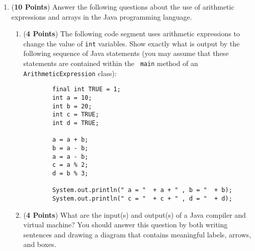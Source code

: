 \documentclass[12pt]{article}
\begin{document}
\begin{enumerate}
\begin{enumerate}
\begin{enumerate}
\item {\tt BankAccount account3 = new BankAccount();} \\
  {\tt account3.deposit(1200);} \\
  {\tt account3.deposit(account3.getBalance());}

\end{enumerate} 

\item \label{values_refs} ({\bf 4 Points}) The Java programming
  language includes primitive data types like {\tt double} and objects
  like {\tt Double}.  Furthermore, it also allows for the creation of
  new classes like {\tt BankAccount} and {\tt CheckingAccount}.  Show
  what the output will be when the {\tt main} method inside of the
  {\tt ValuesAndReferences} class is executed.  Clearly state why the
  output will look the way that you suggest.

\end{enumerate}

\newpage

\item ({\bf 10 Points}) Answer the following questions about the use
  of arithmetic expressions and arrays in the Java programming
  language.

\begin{enumerate}

\item ({\bf 4 Points}) The following code segment uses arithmetic
  expressions to change the value of {\tt int} variables.  Show
  exactly what is output by the following sequence of Java statements
  (you may assume that these statements are contained within the {\tt
    main} method of an {\tt ArithmeticExpression} class):

\begin{verbatim}
        final int TRUE = 1;
        int a = 10;
        int b = 20;
        int c = TRUE;
        int d = TRUE;
        
        a = a + b;
        b = a - b;
        a = a - b;
        c = a % 2;
        d = b % 3;
        
        System.out.println(" a = "  + a + " , b = "  + b);
        System.out.println(" c = "  + c + " , d = "  + d);
\end{verbatim}

\item ({\bf 4 Points}) What are the input(s) and output(s) of a Java compiler and virtual machine?  You should answer
  this question by both writing sentences and drawing a diagram that contains meaningful labels, arrows, and boxes.


\end{enumerate}
\end{enumerate}
\end{document}
